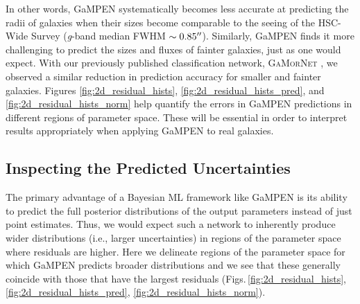 \documentclass[twocolumn]{aastex63}
\newcommand\gamornet{G\textsc{a}M\textsc{or}N\textsc{et}}
\newcommand\gampen{GaMPEN}
\begin{document}
\begin{CJK*}{UTF8}{gbsn}
In other words, \gampen{} systematically becomes less accurate at predicting the radii of galaxies when their sizes become comparable to the seeing of the HSC-Wide Survey (\textit{g}-band median FWHM $\sim0.85\mbox{$^{\prime\prime}$}$). Similarly, \gampen{} finds it more challenging to predict the sizes and fluxes of fainter galaxies, just as one would expect.
With our previously published classification network, \gamornet{} \citep{Ghosh2020GalaxyGalaxies}, we observed a similar reduction in prediction accuracy for smaller and fainter galaxies. Figures \ref{fig:2d_residual_hists}, \ref{fig:2d_residual_hists_pred}, and \ref{fig:2d_residual_hists_norm} help quantify the errors in \gampen{} predictions in different regions of parameter space. These will be essential in order to interpret results appropriately when applying \gampen{} to real galaxies. 

\vspace{0.8cm}

\subsection{Inspecting the Predicted Uncertainties} \label{subsec:uncertainties}
The primary advantage of a Bayesian ML framework like \gampen{} is its ability to predict the full posterior distributions of the output parameters instead of just point estimates. Thus, we would expect such a network to inherently produce wider distributions (i.e., larger uncertainties) in regions of the parameter space where residuals are higher. Here we delineate regions of the parameter space for which \gampen{} predicts broader distributions and we see that these generally coincide with those that have the largest residuals (Figs.\,\ref{fig:2d_residual_hists}, \ref{fig:2d_residual_hists_pred}, \ref{fig:2d_residual_hists_norm}).  


\end{CJK*}
\end{document}

